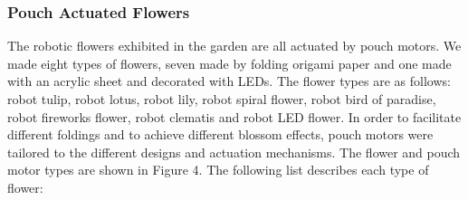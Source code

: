 \documentclass[letterpaper, 10 pt, conference]{ieeeconf}  %
\begin{document}
\subsubsection{\textbf{Pouch Actuated Flowers}}

The robotic flowers exhibited in the garden are all actuated by pouch motors. We made eight types of flowers, seven made by folding origami paper and one made with an acrylic sheet and decorated with LEDs. The flower types are as follows: robot tulip, robot lotus, robot lily, robot spiral flower, robot bird of paradise, robot fireworks flower, robot clematis and robot LED flower. In order to facilitate different foldings and to achieve different blossom effects, pouch motors were tailored to the different designs and actuation mechanisms.  The flower and pouch motor types are shown in Figure 4.  The following list describes each type of flower:
\end{document}
